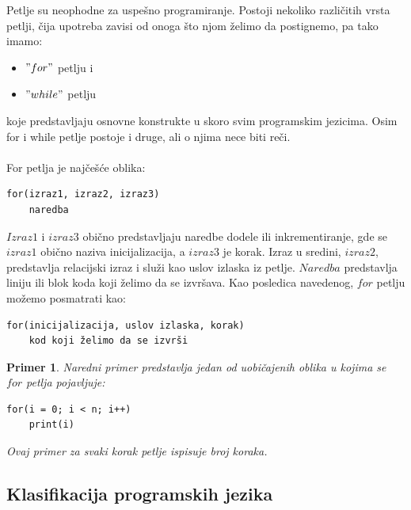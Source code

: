 \documentclass[a4paper]{article}
\newtheorem{primer}{Primer}[section]
\begin{document}
Petlje su neophodne za uspešno programiranje. 
 Postoji nekoliko različitih vrsta petlji,  čija upotreba zavisi od onoga što njom želimo da postignemo, pa tako imamo:
\begin{itemize}
\item $"for"$ petlju i
\item $"while"$ petlju 
\end{itemize}
koje predstavljaju osnovne konstrukte u skoro svim programskim jezicima. Osim for i while petlje postoje i druge, ali o njima nece biti reči.\\\\
For petlja je najčešće oblika:
\begin{lstlisting}[backgroundcolor = \color{lightgray}]
for(izraz1, izraz2, izraz3)
    naredba
\end{lstlisting}
$Izraz1$ i $izraz3$ obično predstavljaju naredbe dodele ili inkrementiranje, gde se $izraz1$ obično naziva inicijalizacija, a $izraz3$ je korak. Izraz u sredini, $izraz2$, predstavlja relacijski izraz i služi kao uslov izlaska iz petlje. $Naredba$ predstavlja liniju ili blok koda koji želimo da se izvršava.
Kao posledica navedenog, $for$ petlju možemo posmatrati kao:
\begin{verbatim}
for(inicijalizacija, uslov izlaska, korak)
    kod koji želimo da se izvrši
\end{verbatim}
\begin{primer}
Naredni primer predstavlja jedan od uobičajenih oblika u kojima se $for$ petlja pojavljuje:
\begin{lstlisting}[backgroundcolor = \color{lightgray}]
for(i = 0; i < n; i++)
    print(i)
\end{lstlisting}
Ovaj primer za svaki korak petlje ispisuje broj koraka. 
\end{primer}


\subsection{Klasifikacija programskih jezika}
\end{document}
